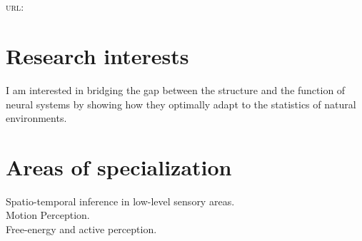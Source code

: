 \documentclass[11pt, a4paper]{article}
\newcommand{\years}[1]{\marginnote{\scriptsize #1}}
\begin{document}
\pagestyle{empty}
\reversemarginpar
\textsf{\Large \Author}\\[1cm]
\Address \\[.2cm]
\textsc{url}: \href{\Website}{\Website}\\ 
\section*{Research interests}
I am interested in bridging the gap between the structure and the function of neural systems by showing how they optimally adapt to the statistics of natural environments.


\section*{Areas of specialization}
Spatio-temporal inference in low-level sensory areas. \\
Motion Perception. \\
Free-energy and active perception.

%
%
\end{document}

